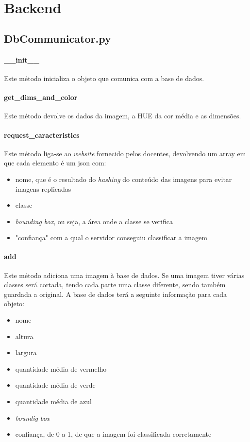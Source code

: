 \documentclass{report}
\begin{document}
\section{Backend}
\subsection{DbCommunicator.py}
\paragraph{\_\_init\_\_}
Este método inicializa o objeto que comunica com a base de dados.

\paragraph{get\_dims\_and\_color}
Este método devolve os dados da imagem, a HUE da cor média e as dimensões. 

\paragraph{request\_caracteristics}
Este método liga-se ao \textit{website} fornecido pelos docentes, devolvendo um array em que cada elemento é um \ac{json} com:
\begin{itemize}
\item nome,  que é o resultado do \textit{hashing} do conteúdo das imagens para evitar imagens replicadas
\item classe
\item \textit{bounding box}, ou seja, a área onde a classe se verifica
\item "confiança" com a qual o servidor conseguiu classificar a imagem
\end{itemize}

\paragraph{add}
Este método adiciona uma imagem à base de dados. Se uma imagem tiver várias classes será cortada, 
tendo cada parte uma classe diferente, sendo também guardada a original. A base de dados terá a 
seguinte informação para cada objeto:
\begin{itemize}
\item nome
\item altura
\item largura
\item quantidade média de vermelho
\item quantidade média de verde
\item quantidade média de azul
\item \textit{boundig box}
\item confiança, de 0 a 1, de que a imagem foi classificada corretamente
\end{itemize}
\end{document}
